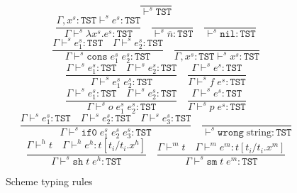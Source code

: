 \begin{figure}[p]
\[
\frac{}{\vdash^s\mathtt{TST}}
\]
\bigskip
\[
\frac{\Gamma,x^s:\mathtt{TST}\vdash^se^s:\mathtt{TST}}{\Gamma\vdash^s\lambda x^s.e^s:\mathtt{TST}}
\quad
\frac{}{\vdash^s\overline{n}:\mathtt{TST}}
\quad
\frac{}{\vdash^s\mathtt{nil}:\mathtt{TST}}
\]
\[
\frac{\Gamma\vdash^se^s_1:\mathtt{TST}\quad\Gamma\vdash^se^s_2:\mathtt{TST}}{\Gamma\vdash^s\mathtt{cons}\;e^s_1\;e^s_2:\mathtt{TST}}
\quad
\frac{}{\Gamma,x^s:\mathtt{TST}\vdash^sx^s:\mathtt{TST}}
\]
\[
\frac{\Gamma\vdash^se^s_1:\mathtt{TST}\quad\Gamma\vdash^se^s_2:\mathtt{TST}}{\Gamma\vdash^se^s_1\;e^s_2:\mathtt{TST}}
\quad
\frac{\Gamma\vdash^se^s:\mathtt{TST}}{\Gamma\vdash^sf\;e^s:\mathtt{TST}}
\]
\[
\frac{\Gamma\vdash^se^s_1:\mathtt{TST}\quad\Gamma\vdash^se^s_2:\mathtt{TST}}{\Gamma\vdash^so\;e^s_1\;e^s_2:\mathtt{TST}}
\quad
\frac{\Gamma\vdash^se^s:\mathtt{TST}}{\Gamma\vdash^sp\;e^s:\mathtt{TST}}
\]
\[
\frac{\Gamma\vdash^se^s_1:\mathtt{TST}\quad\Gamma\vdash^se^s_2:\mathtt{TST}\quad\Gamma\vdash^se^s_3:\mathtt{TST}}{\Gamma\vdash^s\mathtt{if0}\;e^s_1\;e^s_2\;e^s_3:\mathtt{TST}}
\quad
\frac{}{\vdash^s\mathtt{wrong}\;\mathrm{string}:\mathtt{TST}}
\]
\[
\frac{\Gamma\vdash^ht\quad\Gamma\vdash^he^h:t[t_i/t_i.x^h]}{\Gamma\vdash^s\mathtt{sh}\;t\;e^h:\mathtt{TST}}
\quad
\frac{\Gamma\vdash^mt\quad\Gamma\vdash^me^m:t[t_i/t_i.x^m]}{\Gamma\vdash^s\mathtt{sm}\;t\;e^m:\mathtt{TST}}
\]
\caption{Scheme typing rules}
\label{str}
\end{figure}
